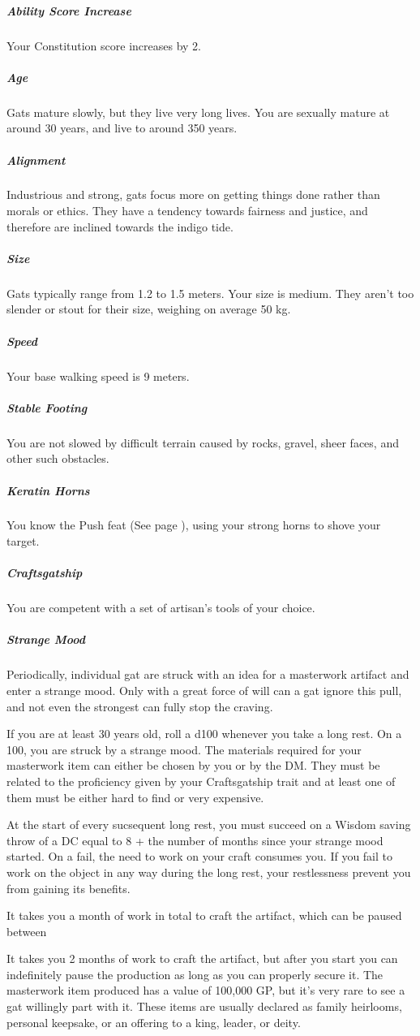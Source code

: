 \subparagraph{Ability Score Increase} Your Constitution score increases by 2.

\subparagraph{Age} Gats mature slowly, but they live very long lives.
You are sexually mature at around 30 years, and live to around 350 years.

\subparagraph{Alignment} Industrious and strong, gats focus more on getting things done rather than morals or ethics.
They have a tendency towards fairness and justice, and therefore are inclined towards the indigo tide.

\subparagraph{Size} Gats typically range from 1.2 to 1.5 meters.
Your size is medium.
They aren't too slender or stout for their size, weighing on average 50 kg.

\subparagraph{Speed} Your base walking speed is 9 meters.

\subparagraph{Stable Footing} You are not slowed by difficult terrain caused by rocks, gravel, sheer faces, and other such obstacles.

\subparagraph{Keratin Horns} You know the Push feat (See page \pageref{feat::push}), using your strong horns to shove your target.

\subparagraph{Craftsgatship} You are competent with a set of artisan's tools of your choice.

\subparagraph{Strange Mood} Periodically, individual gat are struck with an idea for a masterwork artifact and enter a strange mood.
Only with a great force of will can a gat ignore this pull, and not even the strongest can fully stop the craving.

If you are at least 30 years old, roll a d100 whenever you take a long rest.
On a 100, you are struck by a strange mood.
The materials required for your masterwork item can either be chosen by you or by the DM.
They must be related to the proficiency given by your Craftsgatship trait and at least one of them must be either hard to find or very expensive.

At the start of every sucsequent long rest, you must succeed on a Wisdom saving throw of a DC equal to 8 + the number of months since your strange mood started.
On a fail, the need to work on your craft consumes you.
If you fail to work on the object in any way during the long rest, your restlessness prevent you from gaining its benefits.

It takes you a month of work in total to craft the artifact, which can be paused between

It takes you 2 months of work to craft the artifact, but after you start you can indefinitely pause the production as long as you can properly secure it.
The masterwork item produced has a value of 100,000 GP, but it's very rare to see a gat willingly part with it.
These items are usually declared as family heirlooms, personal keepsake, or an offering to a king, leader, or deity.

